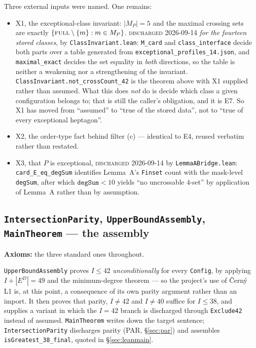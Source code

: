 \documentclass[11pt,a4paper]{article}
\theoremstyle{plain}
\theoremstyle{definition}
\theoremstyle{remark}
\newcommand{\ED}{E^{D}}
\newcommand{\stat}[1]{\footnotesize\textsc{#1}}
\begin{document}
Three external inputs were named. One remains:
\begin{itemize}[leftmargin=*,nosep]
  \item \textsf{X1}, the exceptional-class invariant: $|M_P|=5$ and the maximal
    crossing sets are exactly $\{\textsc{full}\setminus\{m\}:m\in M_P\}$.
    \stat{discharged} 2026-09-14 \emph{for the fourteen stored classes}, by
    \texttt{ClassInvariant.lean}: \texttt{M\_card} and \texttt{class\_interface}
    decide both parts over a table generated from
    \texttt{exceptional\_profiles\_14.json}, and \texttt{maximal\_exact} decides
    the set equality in \emph{both} directions, so the table is neither a
    weakening nor a strengthening of the invariant.
    \texttt{ClassInvariant.not\_crossCount\_42} is the theorem above with
    \textsf{X1} supplied rather than assumed. What this does \emph{not} do is
    decide which class a given configuration belongs to; that is still the
    caller's obligation, and it is \textsf{E7}. So \textsf{X1} has moved from
    ``assumed'' to ``true of the stored data'', not to ``true of every
    exceptional heptagon''.
  \item \textsf{X2}, the order-type fact behind filter (c) --- identical to
    \textsf{E4}, reused verbatim rather than restated.
  \item \textsf{X3}, that $P$ is exceptional, \stat{discharged} 2026-09-14 by
    \texttt{LemmaABridge.lean}: \texttt{card\_E\_eq\_degSum} identifies Lemma~A's
    \texttt{Finset} count with the mask-level \texttt{degSum}, after which
    $\texttt{degSum}<10$ yields ``no uncrossable $4$-set'' by application of
    Lemma~A rather than by assumption.
\end{itemize}

\subsection*{\texttt{IntersectionParity}, \texttt{UpperBoundAssembly}, \texttt{MainTheorem} --- the assembly}
\textbf{Axioms:} the three standard ones throughout.

\texttt{UpperBoundAssembly} proves $I\le42$ \emph{unconditionally} for every
\texttt{Config}, by applying $I+|\ED|=49$ and the minimum-degree theorem --- so
the project's use of {\v C}ern{\'y} L1 is, at this point, a consequence of its
own parity argument rather than an import. It then proves that parity,
$I\neq42$ and $I\neq40$ suffice for $I\le38$, and supplies a variant in which
the $I=42$ branch is discharged through \texttt{Exclude42} instead of assumed.
\texttt{MainTheorem} writes down the target sentence; \texttt{IntersectionParity}
discharges parity (\textsf{PAR}, \S\ref{sec:par}) and assembles
\texttt{isGreatest\_38\_final}, quoted in \S\ref{sec:leanmain}.
\end{document}
